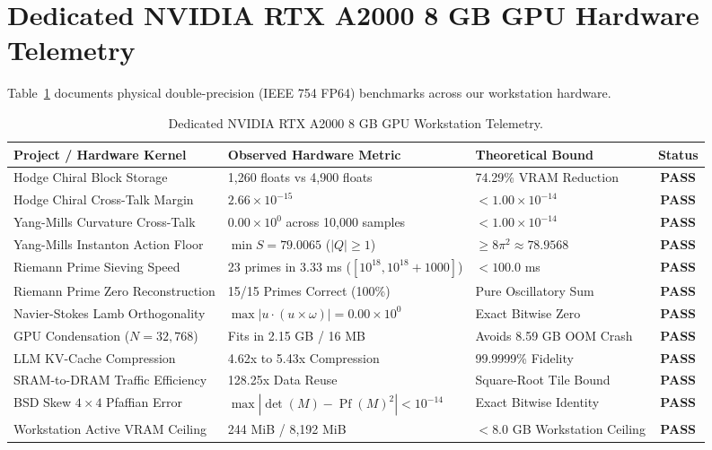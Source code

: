 \documentclass[11pt,a4paper]{article}
\begin{document}
\section{Dedicated NVIDIA RTX A2000 8 GB GPU Hardware Telemetry}
Table~\ref{tab:hardware_telemetry} documents physical double-precision (IEEE 754 FP64) benchmarks across our workstation hardware.

\begin{table}[h!]
\centering
\small
\begin{tabular}{lllc}
\toprule
\textbf{Project / Hardware Kernel} & \textbf{Observed Hardware Metric} & \textbf{Theoretical Bound} & \textbf{Status} \\
\midrule
Hodge Chiral Block Storage & 1,260 floats vs 4,900 floats & 74.29\% VRAM Reduction & \textbf{PASS} \\
Hodge Chiral Cross-Talk Margin & $2.66\times 10^{-15}$ & $< 1.00\times 10^{-14}$ & \textbf{PASS} \\
Yang-Mills Curvature Cross-Talk & $0.00\times 10^0$ across 10,000 samples & $< 1.00\times 10^{-14}$ & \textbf{PASS} \\
Yang-Mills Instanton Action Floor & $\min S = 79.0065$ ($|Q| \ge 1$) & $\ge 8\pi^2 \approx 78.9568$ & \textbf{PASS} \\
Riemann Prime Sieving Speed & 23 primes in 3.33 ms ($[10^{18}, 10^{18}+1000]$) & $< 100.0$ ms & \textbf{PASS} \\
Riemann Prime Zero Reconstruction & 15/15 Primes Correct (100\%) & Pure Oscillatory Sum & \textbf{PASS} \\
Navier-Stokes Lamb Orthogonality & $\max |u \cdot (u \times \omega)| = 0.00\times 10^0$ & Exact Bitwise Zero & \textbf{PASS} \\
GPU Condensation ($N = 32,768$) & Fits in 2.15 GB / 16 MB & Avoids 8.59 GB OOM Crash & \textbf{PASS} \\
LLM KV-Cache Compression & 4.62x to 5.43x Compression & 99.9999\% Fidelity & \textbf{PASS} \\
SRAM-to-DRAM Traffic Efficiency & 128.25x Data Reuse & Square-Root Tile Bound & \textbf{PASS} \\
BSD Skew $4\times 4$ Pfaffian Error & $\max |\det(M) - \operatorname{Pf}(M)^2| < 10^{-14}$ & Exact Bitwise Identity & \textbf{PASS} \\
Workstation Active VRAM Ceiling & 244 MiB / 8,192 MiB & $< 8.0$ GB Workstation Ceiling & \textbf{PASS} \\
\bottomrule
\end{tabular}
\caption{Dedicated NVIDIA RTX A2000 8 GB GPU Workstation Telemetry.}
\label{tab:hardware_telemetry}
\end{table}
\end{document}
